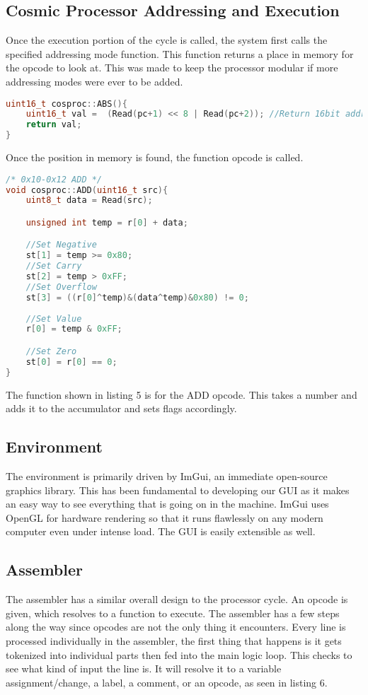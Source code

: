 \documentclass[conference]{IEEEtran}
\begin{document}
\subsection{Cosmic Processor Addressing and Execution}
Once the execution portion of the cycle is called, the system first calls the specified addressing mode function. This function returns a place in memory for the opcode to look at. This was made to keep the processor modular if more addressing modes were ever to be added.

\begin{lstlisting}[language=C++, caption=The Absolute Addressing Mode]
uint16_t cosproc::ABS(){
	uint16_t val =  (Read(pc+1) << 8 | Read(pc+2)); //Return 16bit address of where to look at data
	return val;
}
\end{lstlisting}

Once the position in memory is found, the function opcode is called.

\begin{lstlisting}[language=C++, caption=The ADD function]
/* 0x10-0x12 ADD */
void cosproc::ADD(uint16_t src){
	uint8_t data = Read(src);

	unsigned int temp = r[0] + data;

	//Set Negative
	st[1] = temp >= 0x80;
	//Set Carry
	st[2] = temp > 0xFF;
	//Set Overflow
	st[3] = ((r[0]^temp)&(data^temp)&0x80) != 0;
	
	//Set Value
	r[0] = temp & 0xFF;

	//Set Zero
	st[0] = r[0] == 0;
}
\end{lstlisting}

The function shown in listing 5 is for the ADD opcode. This takes a number and adds it to the accumulator and sets flags accordingly. 

\subsection{Environment}
The environment is primarily driven by ImGui, an immediate open-source graphics library. This has been fundamental to developing our GUI as it makes an easy way to see everything that is going on in the machine. ImGui uses OpenGL for hardware rendering so that it runs flawlessly on any modern computer even under intense load. The GUI is easily extensible as well.

\subsection{Assembler}
The assembler has a similar overall design to the processor cycle. An opcode is given, which resolves to a function to execute. The assembler has a few steps along the way since opcodes are not the only thing it encounters. Every line is processed individually in the assembler, the first thing that happens is it gets tokenized into individual parts then fed into the main logic loop. This checks to see what kind of input the line is. It will resolve it to a variable assignment/change, a label, a comment, or an opcode, as seen in listing 6.
\end{document}
